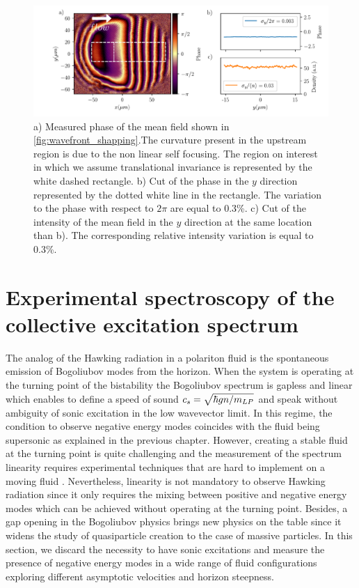\begin{figure}[h]
    \centering
    \includegraphics[width=1\textwidth]{chap_custom_st/fig/phase_example.pdf}
    \caption{a) Measured phase of the mean field shown in \autoref{fig:wavefront_shapping}.The curvature present in the upstream region is due to the non linear self focusing. The region
    on interest in which we assume translational invariance is represented by the white dashed rectangle. b)  Cut of the phase in the $y$ direction represented by the dotted white line in the rectangle. The variation to the phase with respect
    to $2\pi$ are equal to 0.3\%. c) Cut of the intensity of the mean field in the $y$ direction at the same location than b). The corresponding relative intensity variation is equal to 0.3\%.}
    \label{fig:phase_example}
\end{figure}

\section{Experimental spectroscopy of the collective excitation spectrum}

The analog of the Hawking radiation in a polariton fluid is the spontaneous emission of Bogoliubov modes from the horizon. When the system is operating at the turning point of the bistability the Bogoliubov spectrum 
is gapless and linear which enables to define a speed of sound $c_s = \sqrt{\hbar g n /m_{LP}}$ and speak without ambiguity of sonic excitation in the low wavevector limit. In this regime, the condition to observe negative energy modes coincides with the fluid being supersonic as explained in the previous chapter. 
However, creating a stable fluid at the turning point is quite challenging and the measurement of the spectrum linearity requires experimental techniques that are hard to implement on a moving fluid \cite{claude_phd}. Nevertheless, linearity is not mandatory to observe Hawking radiation since 
it only requires the mixing between positive and negative energy modes which can be achieved without operating at the turning point. Besides, a gap opening in the Bogoliubov physics brings new physics on the table since it widens the study of quasiparticle creation to the case of massive particles. In this
section, we discard the necessity to have sonic excitations and measure the presence of negative energy modes in a wide range of fluid configurations exploring different asymptotic velocities and horizon steepness.

